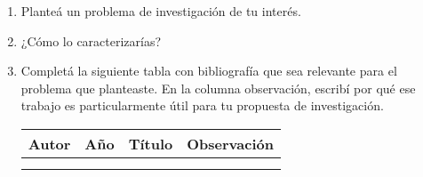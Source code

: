 \documentclass[12pt,spanish,a4paper,]{article}
\begin{document}
\begin{enumerate}
\def\labelenumi{\arabic{enumi}.}
\item
  Planteá un problema de investigación de tu interés.
\item
  ¿Cómo lo caracterizarías?
\item
  Completá la siguiente tabla con bibliografía que sea relevante para el
  problema que planteaste. En la columna observación, escribí por qué
  ese trabajo es particularmente útil para tu propuesta de
  investigación.

  \begin{longtable}[]{@{}llll@{}}
  \toprule
  \begin{minipage}[b]{0.22\columnwidth}\raggedright
  Autor\strut
  \end{minipage} & \begin{minipage}[b]{0.15\columnwidth}\raggedright
  Año\strut
  \end{minipage} & \begin{minipage}[b]{0.17\columnwidth}\raggedright
  Título\strut
  \end{minipage} & \begin{minipage}[b]{0.34\columnwidth}\raggedright
  Observación\strut
  \end{minipage}\tabularnewline
  \midrule
  \endhead
  \begin{minipage}[t]{0.22\columnwidth}\raggedright
  \strut
  \end{minipage} & \begin{minipage}[t]{0.15\columnwidth}\raggedright
  \strut
  \end{minipage} & \begin{minipage}[t]{0.17\columnwidth}\raggedright
  \strut
  \end{minipage} & \begin{minipage}[t]{0.34\columnwidth}\raggedright
  \strut
  \end{minipage}\tabularnewline
  \begin{minipage}[t]{0.22\columnwidth}\raggedright
  \strut
  \end{minipage} & \begin{minipage}[t]{0.15\columnwidth}\raggedright
  \strut
  \end{minipage} & \begin{minipage}[t]{0.17\columnwidth}\raggedright
  \strut
  \end{minipage} & \begin{minipage}[t]{0.34\columnwidth}\raggedright
  \strut
  \end{minipage}\tabularnewline

\end{longtable}
\end{enumerate}
\end{document}
